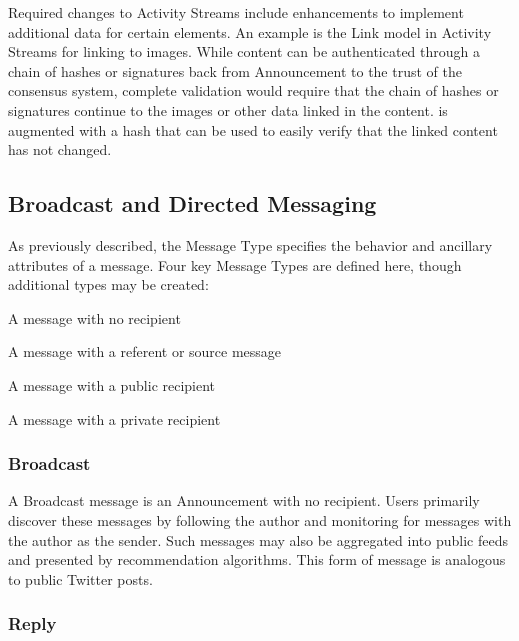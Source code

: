 \documentclass[12pt,letterpaper]{article}
\providecommand{\tightlist}{%
\setlength{\itemsep}{0pt}\setlength{\parskip}{0pt}}
\begin{document}
Required changes to Activity Streams include enhancements to implement additional data for
certain elements. An example is the Link model in Activity Streams for linking to images.
While content can be authenticated through a chain of hashes or signatures back from
Announcement to the trust of the consensus system, complete validation would require that
the chain of hashes or signatures continue to the images or other data linked in the
content.   is augmented with a hash that can be used to easily verify that the
linked content has not changed.

\subsection{Broadcast and Directed Messaging}\label{sec:broadcast_and_directed_messaging}

As previously described, the Message Type specifies the behavior and ancillary attributes of
a message. Four key Message Types are defined here, though additional types may be created:

\begin{samepage}
	\begin{description}
		\tightlist
		\item[Broadcast:]
		      A message with no recipient
		\item[Reply:]
		      A message with a referent or source message
		\item[Direct:]
		      A message with a public recipient
		\item[Dead Drop:]
		      A message with a private recipient
	\end{description}
\end{samepage}

\subsubsection{Broadcast}

A Broadcast message is an Announcement with no recipient. Users primarily discover these
messages by following the author and monitoring for messages with the author as the
sender. Such messages may also be aggregated into public feeds and presented by
recommendation algorithms. This form of message is analogous to public Twitter posts.

\subsubsection{Reply}
\end{document}
